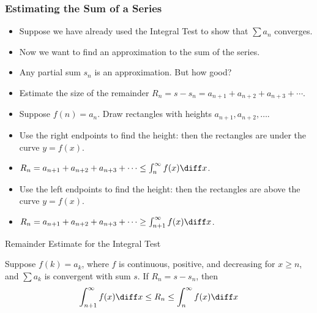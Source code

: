\begin{frame}
\frametitle{Estimating the Sum of a Series}
\begin{itemize}
\item  Suppose we have already used the Integral Test to show that $\sum a_n$ converges.
\item  Now we want to find an approximation to the sum of the series.
\item<2->  Any partial sum $s_n$ is an approximation.  But how good?
\item<3->  Estimate the size of the remainder $R_n = s - s_n = a_{n+1}+a_{n+2}+a_{n+3}+\cdots $.
\item<4->  Suppose $f(n) = a_n$.  Draw rectangles with heights $a_{n+1}, a_{n+2}, \ldots$.
\item<5->  Use the right endpoints to find the height: then the rectangles are under the curve $y = f(x)$.
\item<6->  $R_n = a_{n+1}+a_{n+2}+a_{n+3}+\cdots \leq \int_n^\infty f(x)\diff x$.
\item<5->  Use the left endpoints to find the height: then the rectangles are above the curve $y = f(x)$.
\item<7->  $R_n = a_{n+1}+a_{n+2}+a_{n+3}+\cdots \geq \int_{n+1}^\infty f(x)\diff x$.
\end{itemize}
\end{frame}


\begin{frame}
Remainder Estimate for the Integral Test

Suppose $f(k) = a_k$, where $f$ is continuous, positive, and decreasing for $x\geq n$, and $\sum a_k$ is convergent with sum $s$.  If $R_n = s - s_n$, then
\[
\int_{n+1}^\infty f(x)\diff x \leq R_n \leq \int_n^\infty f(x)\diff x%
\]
\end{frame}

